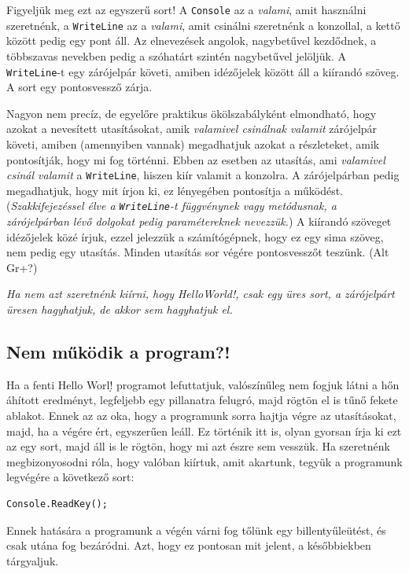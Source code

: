 \documentclass[a4paper]{article}
\begin{document}
Figyeljük meg ezt az egyszerű sort! A \lstinline{Console} az a \emph{valami}, amit használni szeretnénk, a \lstinline{WriteLine} az a \emph{valami}, amit csinálni szeretnénk a konzollal, a kettő között pedig egy pont áll. Az elnevezések angolok, nagybetűvel kezdődnek, a többszavas nevekben pedig a szóhatárt szintén nagybetűvel jelöljük. A \lstinline{WriteLine}-t egy zárójelpár követi, amiben idézőjelek között áll a kiírandó szöveg. A sort egy pontosvessző zárja.

Nagyon nem precíz, de egyelőre praktikus ökölszabályként elmondható, hogy azokat a nevesített utasításokat, amik \emph{valamivel csinálnak valamit} zárójelpár követi, amiben (amennyiben vannak) megadhatjuk azokat a részleteket, amik pontosítják, hogy mi fog történni. Ebben az esetben az utasítás, ami \emph{valamivel csinál valamit} a \lstinline{WriteLine}, hiszen kiír valamit a konzolra. A zárójelpárban pedig megadhatjuk, hogy mit írjon ki, ez lényegében pontosítja a működést. (\emph{Szakkifejezéssel élve a \lstinline{WriteLine}-t függvénynek vagy metódusnak, a zárójelpárban lévő dolgokat pedig paramétereknek nevezzük.}) A kiírandó szöveget idézőjelek közé írjuk, ezzel jelezzük a számítógépnek, hogy ez egy sima szöveg, nem pedig egy utasítás. Minden utasítás sor végére pontosvesszőt teszünk. (Alt Gr+?)

\emph{Ha nem azt szeretnénk kiírni, hogy HelloWorld!, csak egy üres sort, a zárójelpárt üresen hagyhatjuk, de akkor sem hagyhatjuk el.}

\subsection{Nem működik a program?!}
Ha a fenti Hello Worl\d! programot lefuttatjuk, valószínűleg nem fogjuk látni a hőn áhított eredményt, legfeljebb egy pillanatra felugró, majd rögtön el is tűnő fekete ablakot. Ennek az az oka, hogy a programunk sorra hajtja végre az utasításokat, majd, ha a végére ért, egyszerűen leáll. Ez történik itt is, olyan gyorsan írja ki ezt az egy sort, majd áll is le rögtön, hogy mi azt észre sem vesszük. Ha szeretnénk megbizonyosodni róla, hogy valóban kiírtuk, amit akartunk, tegyük a programunk legvégére a következő sort:

\begin{lstlisting}[caption=Várakozás billentyűleütésre, label=lst:readkey]
Console.ReadKey();
\end{lstlisting}

Ennek hatására a programunk a végén várni fog tőlünk egy billentyűleütést, és csak utána fog bezáródni. Azt, hogy ez pontosan mit jelent, a későbbiekben tárgyaljuk.
\end{document}

